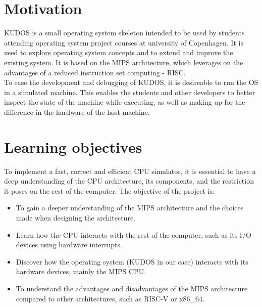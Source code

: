\documentclass[11pt]{article}
\begin{document}
\section{Motivation}
KUDOS is a small operating system skeleton intended to be used by students         
attending operating system project courses at university of Copenhagen.         
It is used to explore operating system concepts and to extend and improve the   
existing system.                                                                
It is based on the MIPS architecture, which leverages on the advantages of a       
reduced instruction set computing - RISC.\\                                     
To ease the development and debugging of KUDOS, it is desireable to run the OS  
in a simulated machine. This enables the students and other developers to          
better inspect the state of the machine while executing, as well as making up   
for the difference in the hardware of the host machine.                         

\section{Learning objectives}
To implement a fast, correct and efficient CPU simulator, it is essential to have a deep understanding of the CPU architecture, its components, and the restriction it poses on the rest of the computer.
The objective of the project is:
\begin{itemize}
\item To gain a deeper understanding of the MIPS architecture and the choices made when
designing the architecture. 
\item Learn how the CPU interacts with the rest of the computer, such as its I/O devices using hardware interrupts.
\item Discover how the operating system (KUDOS in our case) interacts with its hardware
devices, mainly the MIPS CPU.
\item To understand the advantages and disadvantages of the MIPS architecture compared to other architectures, such as RISC-V or x86\_64.
\end{itemize}  
\end{document}
